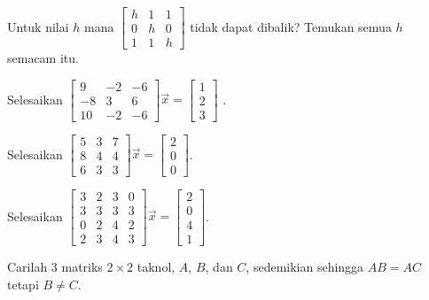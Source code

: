 \begin{exercise}
Untuk nilai $h$ mana
$\left[ \begin{smallmatrix}
h & 1 & 1 \\
0 & h & 0 \\
1 & 1 & h
\end{smallmatrix} \right]$
tidak dapat dibalik?  Temukan semua $h$ semacam itu.
\end{exercise}

\begin{exercise}
Selesaikan
$\left[ \begin{smallmatrix}
9 & -2 & -6 \\
-8 & 3 & 6 \\
10 & -2 & -6
\end{smallmatrix} \right] \vec{x} =
\left[ \begin{smallmatrix}
1 \\
2 \\
3
\end{smallmatrix} \right]$ .
\end{exercise}

\begin{exercise}
Selesaikan
$\left[ \begin{smallmatrix}
5 & 3 & 7 \\
8 & 4 & 4 \\
6 & 3 & 3
\end{smallmatrix} \right] \vec{x} =
\left[ \begin{smallmatrix}
2 \\
0 \\
0
\end{smallmatrix} \right]$.
\end{exercise}

\begin{exercise}
Selesaikan
$\left[ \begin{smallmatrix}
3 & 2 & 3 & 0 \\
3 & 3 & 3 & 3 \\
0 & 2 & 4 & 2 \\
2 & 3 & 4 & 3
\end{smallmatrix} \right] \vec{x} =
\left[ \begin{smallmatrix}
2 \\
0 \\
4 \\
1
\end{smallmatrix} \right]$.
\end{exercise}

\begin{exercise}
Carilah 3 matriks $2 \times 2$ taknol, $A$, $B$, dan $C$, sedemikian sehingga
$AB = AC$ tetapi $B \neq C$.
\end{exercise}


